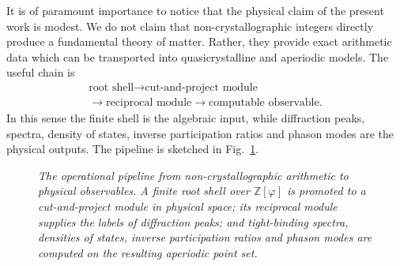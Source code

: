 \documentclass[12pt,oneside,english]{amsart}
\numberwithin{equation}{section}
\numberwithin{figure}{section}
\numberwithin{table}{section}
\theoremstyle{plain}
\theoremstyle{definition}
\theoremstyle{remark}
\newcommand{\RR}{\mathbb R}
\newcommand{\Zphi}{\mathbb Z[\varphi]}
\begin{document}
It is of paramount importance to notice that the physical claim of the present work is modest. We do not claim that non-crystallographic integers directly produce a fundamental theory of matter. Rather, they provide exact arithmetic data which can be transported into quasicrystalline and aperiodic models. The useful chain is
\begin{equation}
\begin{gathered}
\text{root shell}\longrightarrow\text{cut-and-project module}\\
\longrightarrow\text{reciprocal module}\longrightarrow\text{computable observable}.
\end{gathered}
\label{eq:physics-pipeline}
\end{equation}
In this sense the finite shell is the algebraic input, while diffraction peaks, spectra, density of states, inverse participation ratios and phason modes are the physical outputs. The pipeline is sketched in Fig.~\ref{fig:physics-pipeline}.

\begin{figure}[htbp]
\centering
{}
\caption{\emph{The operational pipeline from non-crystallographic arithmetic to physical observables. A finite root shell over $\Zphi$ is promoted to a cut-and-project module in physical space; its reciprocal module supplies the labels of diffraction peaks; and tight-binding spectra, densities of states, inverse participation ratios and phason modes are computed on the resulting aperiodic point set.}}
\label{fig:physics-pipeline}
\end{figure}
\end{document}
